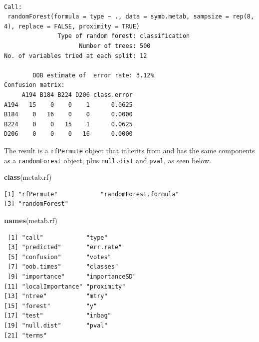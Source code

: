 \documentclass[]{article}
\newenvironment{Shaded}{\begin{snugshade}}{\end{snugshade}}
\newcommand{\KeywordTok}[1]{\textcolor[rgb]{0.13,0.29,0.53}{\textbf{{#1}}}}
\newcommand{\NormalTok}[1]{{#1}}
\begin{document}
\begin{verbatim}

Call:
 randomForest(formula = type ~ ., data = symb.metab, sampsize = rep(8,      4), replace = FALSE, proximity = TRUE) 
               Type of random forest: classification
                     Number of trees: 500
No. of variables tried at each split: 12

        OOB estimate of  error rate: 3.12%
Confusion matrix:
     A194 B184 B224 D206 class.error
A194   15    0    0    1      0.0625
B184    0   16    0    0      0.0000
B224    0    0   15    1      0.0625
D206    0    0    0   16      0.0000
\end{verbatim}

The result is a \texttt{rfPermute} object that inherits from and has the
same components as a \texttt{randomForest} object, plus
\texttt{null.dist} and \texttt{pval}, as seen below.

\begin{Shaded}
\begin{Highlighting}[]
\KeywordTok{class}\NormalTok{(metab.rf)}
\end{Highlighting}
\end{Shaded}

\begin{verbatim}
[1] "rfPermute"            "randomForest.formula"
[3] "randomForest"        
\end{verbatim}

\begin{Shaded}
\begin{Highlighting}[]
\KeywordTok{names}\NormalTok{(metab.rf)}
\end{Highlighting}
\end{Shaded}

\begin{verbatim}
 [1] "call"            "type"           
 [3] "predicted"       "err.rate"       
 [5] "confusion"       "votes"          
 [7] "oob.times"       "classes"        
 [9] "importance"      "importanceSD"   
[11] "localImportance" "proximity"      
[13] "ntree"           "mtry"           
[15] "forest"          "y"              
[17] "test"            "inbag"          
[19] "null.dist"       "pval"           
[21] "terms"          
\end{verbatim}

\begin{Shaded}
\end{Shaded}
\end{document}
